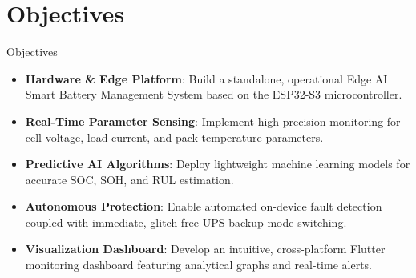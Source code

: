\documentclass[10pt,aspectratio=43]{beamer}
\begin{document}
\section{Objectives}
\begin{frame}{Objectives}
  \begin{itemize}
    \setlength{\itemsep}{6pt}
    \item \textbf{Hardware \& Edge Platform}: Build a standalone, operational Edge AI Smart Battery Management System based on the ESP32-S3 microcontroller.
    \item \textbf{Real-Time Parameter Sensing}: Implement high-precision monitoring for cell voltage, load current, and pack temperature parameters.
    \item \textbf{Predictive AI Algorithms}: Deploy lightweight machine learning models for accurate SOC, SOH, and RUL estimation.
    \item \textbf{Autonomous Protection}: Enable automated on-device fault detection coupled with immediate, glitch-free UPS backup mode switching.
    \item \textbf{Visualization Dashboard}: Develop an intuitive, cross-platform Flutter monitoring dashboard featuring analytical graphs and real-time alerts.
  \end{itemize}
\end{frame}
\end{document}
